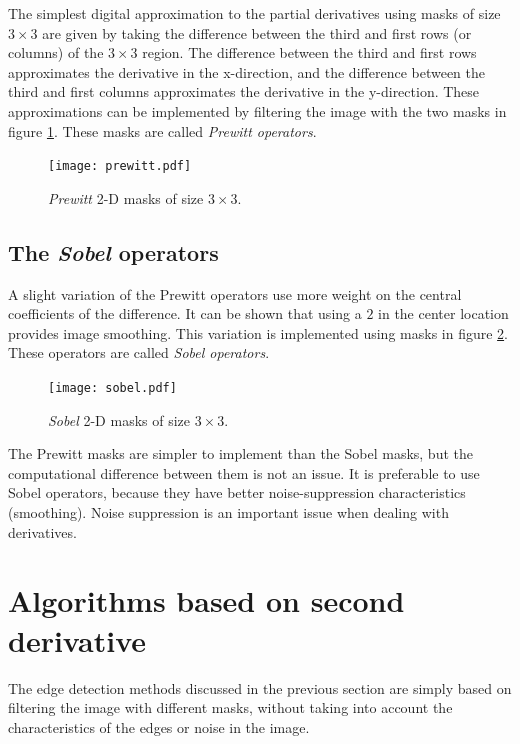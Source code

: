 \documentclass{ipol}
\numberwithin{equation}{section}
\numberwithin{table}{section}
\numberwithin{figure}{section}
\begin{document}
The simplest digital approximation to the partial derivatives using masks of size $3\times3$ are given 
by taking the difference between the third and first rows (or columns) of the $3\times3$ region. The
difference between the third and first rows approximates the derivative in the x-direction, and 
the difference between the third and first columns approximates the derivative in the y-direction.
These approximations can be implemented by filtering the image with the two masks in figure \ref{fig:prewitt}.
These masks are called \textit{Prewitt operators}.\\

\begin{figure}
	\centering
	\texttt{[image: prewitt.pdf]}
	\caption{\textit{Prewitt} 2-D masks of size $3\times3$.}
	\label{fig:prewitt}
\end{figure}

\subsection{The \textit{Sobel} operators}

A slight variation of the Prewitt operators use more weight on the central coefficients of the 
difference. It can be shown that using a $2$ in the center location provides image smoothing. This
variation is implemented using masks in figure \ref{fig:sobel}. These operators are called 
\textit{Sobel operators}.\\

\begin{figure}
	\centering
	\texttt{[image: sobel.pdf]}
	\caption{\textit{Sobel} 2-D masks of size $3\times3$.}
	\label{fig:sobel}
\end{figure}

The Prewitt masks are simpler to implement than the Sobel masks, but the computational difference
between them is not an issue. It is preferable to use Sobel operators, because they have better
noise-suppression characteristics (smoothing). Noise suppression is an important issue when dealing
with derivatives.\\

\section{Algorithms based on second derivative}
\label{sec:second}

The edge detection methods discussed in the previous section are simply based on filtering the 
image with different masks, without taking into account the characteristics of the edges or 
noise in the image.\\
\end{document}
